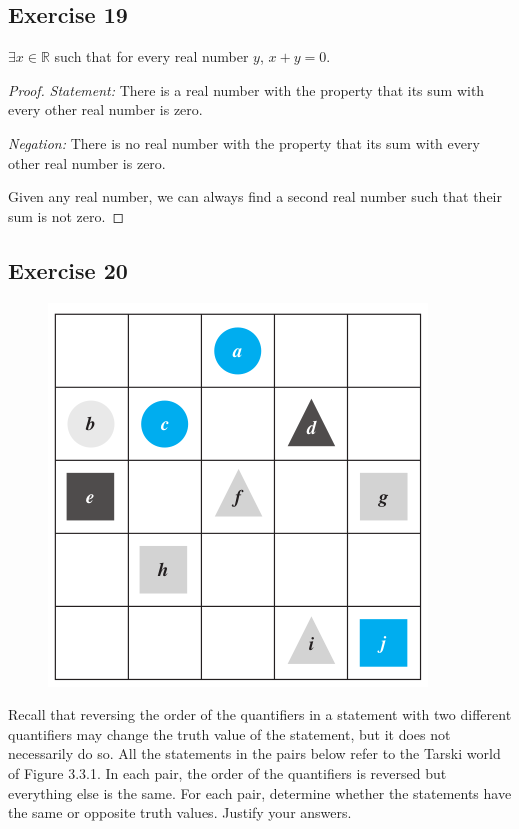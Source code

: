 \documentclass[14pt]{extarticle}
\newcommand{\R}{\mathbb{R}}
\newcommand{\te}{\exists}
\begin{document}
\subsection{Exercise 19}
$\te x \in \R$ such that for every real number $y$, $x + y = 0$.

\begin{proof}
{\it Statement:} There is a real number with the property that its sum with every other real number is zero.

{\it Negation:} There is no real number with the property that its sum with every other real number is zero.

Given any real number, we can always find a second real number such that their sum is not zero.
\end{proof}

\subsection{Exercise 20}
\begin{figure}[ht!]
\centering
\includegraphics[scale=0.4]{../images/3.3.1.png}
\end{figure}

Recall that reversing the order of the quantifiers in a statement with two different quantifiers may change the truth value of the statement, but it does not necessarily do so. All the statements in the pairs below refer to the Tarski world of Figure 3.3.1. In each pair, the order of the quantifiers is reversed but everything else is the same. For each pair, determine whether the statements have the same or opposite truth values. Justify your answers.
\end{document}

